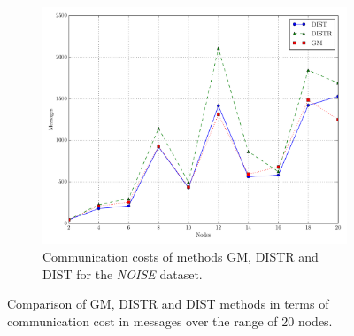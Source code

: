 \begin{figure}[!t]
\begin{subfigure}{0.32\textwidth}%
  \includegraphics[width=\linewidth]{img/matching_msg_noisyinterweaving.pdf}
  \caption{Communication costs of methods GM, DISTR and DIST for the \emph{NOISE} dataset.}
\end{subfigure}
\vspace{0.5cm}
\caption{Comparison of GM, DISTR and DIST methods in terms of communication cost in messages over the range of 20 nodes.} \label{fig:matchingComp-msgs}
\end{figure}
